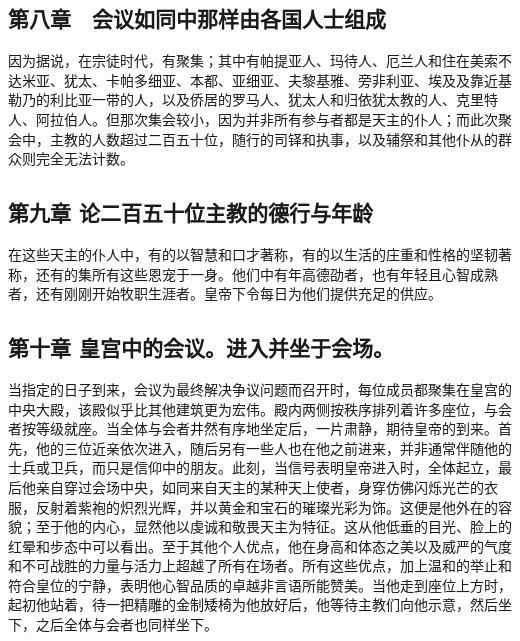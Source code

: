 
\subsection{第八章　会议如同中那样由各国人士组成}

因为据说，在宗徒时代，有聚集；其中有帕提亚人、玛待人、厄兰人和住在美索不达米亚、犹太、卡帕多细亚、本都、亚细亚、夫黎基雅、旁非利亚、埃及及靠近基勒乃的利比亚一带的人，以及侨居的罗马人、犹太人和归依犹太教的人、克里特人、阿拉伯人。但那次集会较小，因为并非所有参与者都是天主的仆人；而此次聚会中，主教的人数超过二百五十位，随行的司铎和执事，以及辅祭和其他仆从的群众则完全无法计数。\par


\subsection{第九章 论二百五十位主教的德行与年龄}

在这些天主的仆人中，有的以智慧和口才著称，有的以生活的庄重和性格的坚韧著称，还有的集所有这些恩宠于一身。他们中有年高德劭者，也有年轻且心智成熟者，还有刚刚开始牧职生涯者。皇帝下令每日为他们提供充足的供应。\par


\subsection{第十章 皇宫中的会议。进入并坐于会场。}

当指定的日子到来，会议为最终解决争议问题而召开时，每位成员都聚集在皇宫的中央大殿，该殿似乎比其他建筑更为宏伟。殿内两侧按秩序排列着许多座位，与会者按等级就座。当全体与会者井然有序地坐定后，一片肃静，期待皇帝的到来。首先，他的三位近亲依次进入，随后另有一些人也在他之前进来，并非通常伴随他的士兵或卫兵，而只是信仰中的朋友。此刻，当信号表明皇帝进入时，全体起立，最后他亲自穿过会场中央，如同来自天主的某种天上使者，身穿仿佛闪烁光芒的衣服，反射着紫袍的炽烈光辉，并以黄金和宝石的璀璨光彩为饰。这便是他外在的容貌；至于他的内心，显然他以虔诚和敬畏天主为特征。这从他低垂的目光、脸上的红晕和步态中可以看出。至于其他个人优点，他在身高和体态之美以及威严的气度和不可战胜的力量与活力上超越了所有在场者。所有这些优点，加上温和的举止和符合皇位的宁静，表明他心智品质的卓越非言语所能赞美。当他走到座位上方时，起初他站着，待一把精雕的金制矮椅为他放好后，他等待主教们向他示意，然后坐下，之后全体与会者也同样坐下。\par

